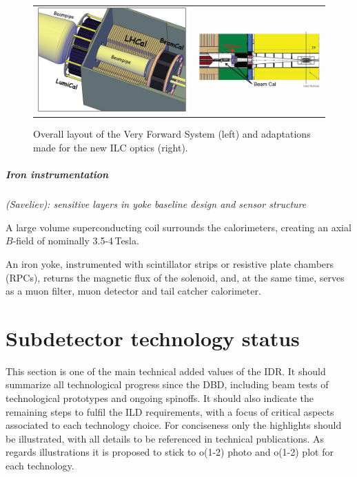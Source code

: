 \begin{figure}[t!]
\begin{tabular}{cc}
\includegraphics[width=0.5\hsize,viewport={0 -10 600 500},clip]{Detector/fig/VFS_layout.png} &
\includegraphics[width=0.4\hsize]{Detector/fig/VFS_newoptics.jpg}
\end{tabular}
\caption{Overall layout of the Very Forward System (left) and adaptations made for the new ILC optics (right).}
\label{fig:det:VFS}
\end{figure}

\vspace{1cm}
\subparagraph*{\bf Iron instrumentation}
\textit{(Saveliev): sensitive layers in yoke baseline design and sensor structure}

A large volume superconducting coil surrounds the calorimeters, creating an axial $B$-field of nominally 3.5-4\,Tesla.

An iron  yoke, instrumented with scintillator strips or resistive plate chambers (RPCs), returns the magnetic flux of the solenoid, and, at the same time, serves as a muon filter, muon detector and tail catcher calorimeter.

\newpage
\section{Subdetector technology status}

This section is one of the main technical added values of the IDR. It should summarize all technological progress since the DBD, including beam tests of technological prototypes and ongoing spinoffs. It should also indicate the remaining steps to fulfil the ILD requirements, with a focus of critical aspects associated to each technology choice. For conciseness only the highlights should be illustrated, with all details to be referenced in technical publications. As regards illustrations it is proposed to stick to o(1-2) photo and o(1-2) plot  for each technology. 

